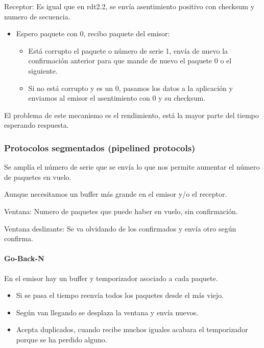 \documentclass[12pt, twoside, openright]{report} %
\begin{document}
\begin{figure}[H]
	{\def\svgwidth{1.2\textwidth}
		}
\end{figure}

Receptor: Es igual que en rdt2.2, se envía asentimiento positivo
con checksum y numero de secuencia.

\begin{itemize}
	\item Espero paquete con 0, recibo paquete del emisor:

	      \begin{itemize}
		      \item Está corrupto el paquete o número de serie 1, envía de nuevo
		            la confirmación anterior para que mande de nuevo el paquete 0
		            o el siguiente.
		      \item Si no está corrupto y es un 0, pasamos los datos a la
		            aplicación y enviamos al emisor el asentimiento con 0 y su
		            checksum.
	      \end{itemize}
\end{itemize}

El problema de este mecanismo es el rendimiento, está la mayor
parte del tiempo esperando respuesta.


\subsubsection{Protocolos segmentados (pipelined protocols)}
Se amplía el número de serie que se envía lo que nos permite
aumentar el número de paquetes en vuelo.

Aunque necesitamos un buffer más grande en el emisor y/o el
receptor.

Ventana: Numero de paquetes que puede haber en vuelo, sin
confirmación.

Ventana deslizante: Se va olvidando de los confirmados y envía
otro según confirma.

\paragraph{Go-Back-N}



En el emisor hay un buffer y temporizador asociado a cada
paquete.

\begin{itemize}
	\item Si se pasa el tiempo reenvía todos los paquetes desde el más
	      viejo.
	\item Según van llegando se desplaza la ventana y envía nuevos.
	\item Acepta duplicados, cuando recibe muchos iguales acabara el
	      temporizador porque se ha perdido alguno.
\end{itemize}
\end{document}
